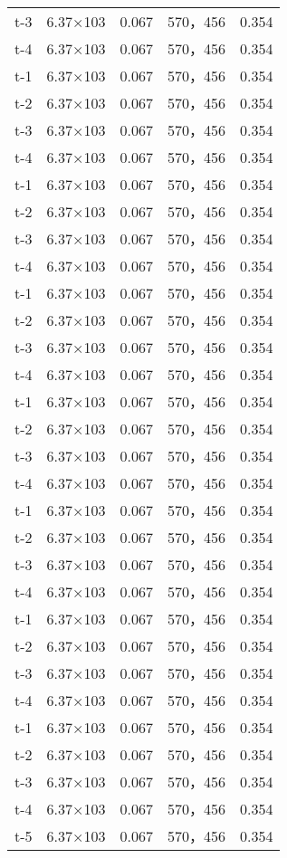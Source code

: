 \begin{longtable}{ccccc}
t-3     &6.37×103       &0.067  &570，456        &0.354\\
t-4     &6.37×103       &0.067  &570，456        &0.354\\
t-1     &6.37×103       &0.067  &570，456        &0.354\\
t-2     &6.37×103       &0.067  &570，456        &0.354\\
t-3     &6.37×103       &0.067  &570，456        &0.354\\
t-4     &6.37×103       &0.067  &570，456        &0.354\\
t-1     &6.37×103       &0.067  &570，456        &0.354\\
t-2     &6.37×103       &0.067  &570，456        &0.354\\
t-3     &6.37×103       &0.067  &570，456        &0.354\\
t-4     &6.37×103       &0.067  &570，456        &0.354\\
t-1     &6.37×103       &0.067  &570，456        &0.354\\
t-2     &6.37×103       &0.067  &570，456        &0.354\\
t-3     &6.37×103       &0.067  &570，456        &0.354\\
t-4     &6.37×103       &0.067  &570，456        &0.354\\
t-1     &6.37×103       &0.067  &570，456        &0.354\\
t-2     &6.37×103       &0.067  &570，456        &0.354\\
t-3     &6.37×103       &0.067  &570，456        &0.354\\
t-4     &6.37×103       &0.067  &570，456        &0.354\\
t-1     &6.37×103       &0.067  &570，456        &0.354\\
t-2     &6.37×103       &0.067  &570，456        &0.354\\
t-3     &6.37×103       &0.067  &570，456        &0.354\\
t-4     &6.37×103       &0.067  &570，456        &0.354\\
t-1     &6.37×103       &0.067  &570，456        &0.354\\
t-2     &6.37×103       &0.067  &570，456        &0.354\\
t-3     &6.37×103       &0.067  &570，456        &0.354\\
t-4     &6.37×103       &0.067  &570，456        &0.354\\
t-1     &6.37×103       &0.067  &570，456        &0.354\\
t-2     &6.37×103       &0.067  &570，456        &0.354\\
t-3     &6.37×103       &0.067  &570，456        &0.354\\
t-4     &6.37×103       &0.067  &570，456        &0.354\\
t-5     &6.37×103       &0.067  &570，456        &0.354\\ \hline
\end{longtable}

